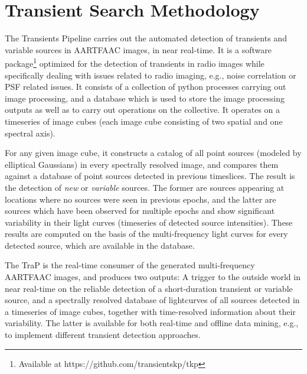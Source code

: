 \documentclass{ws-jai}
\begin{document}
\section {\label{sec:afaac_trap} Transient Search Methodology}
The  Transients  Pipeline  \citep[TraP;][]{swinbank2015lofar}  carries  out  the
automated detection  of transients and  variable sources in AARTFAAC  images, in
near   real-time.     It   is    a   software    package\footnote{Available   at
  https://github.com/transientskp/tkp} optimized for the detection of transients
in radio images while specifically dealing with issues related to radio imaging,
e.g., noise correlation  or PSF related issues.  It consists  of a collection of
python processes carrying out image processing,  and a database which is used to
store the  image processing outputs  as well as to  carry out operations  on the
collective.   It operates  on  a  timeseries of  image  cubes  (each image  cube
consisting of two spatial and one spectral axis).

For any given image cube, it constructs  a catalog of all point sources (modeled
by elliptical Gaussians)  in every spectrally resolved image,  and compares them
against a database of point sources detected in previous timeslices.  The result
is the detection  of \textit{new} or \textit{variable} sources.   The former are
sources appearing  at locations where no  sources were seen in  previous epochs,
and the latter are sources which have been observed for multiple epochs and show
significant variability  in their  light curves  (timeseries of  detected source
intensities). These  results are  computed on the  basis of  the multi-frequency
light curves for every detected source, which are available in the database.

The TraP  is the  real-time consumer of  the generated  multi-frequency AARTFAAC
images,  and produces  two  outputs: A  trigger  to the  outside  world in  near
real-time on  the reliable detection  of a short-duration transient  or variable
source,  and  a spectrally  resolved  database  of  lightcurves of  all  sources
detected in a timeseries of image cubes, together with time-resolved information
about their variability.  The latter is available for both real-time and offline
data mining, e.g., to implement different transient detection approaches.
\end{document}
